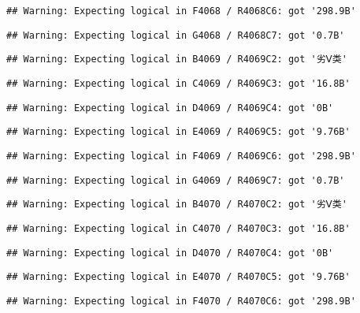 \documentclass[
]{article}
\begin{document}
\begin{verbatim}
## Warning: Expecting logical in F4068 / R4068C6: got '298.9B'
\end{verbatim}

\begin{verbatim}
## Warning: Expecting logical in G4068 / R4068C7: got '0.7B'
\end{verbatim}

\begin{verbatim}
## Warning: Expecting logical in B4069 / R4069C2: got '劣Ⅴ类'
\end{verbatim}

\begin{verbatim}
## Warning: Expecting logical in C4069 / R4069C3: got '16.8B'
\end{verbatim}

\begin{verbatim}
## Warning: Expecting logical in D4069 / R4069C4: got '0B'
\end{verbatim}

\begin{verbatim}
## Warning: Expecting logical in E4069 / R4069C5: got '9.76B'
\end{verbatim}

\begin{verbatim}
## Warning: Expecting logical in F4069 / R4069C6: got '298.9B'
\end{verbatim}

\begin{verbatim}
## Warning: Expecting logical in G4069 / R4069C7: got '0.7B'
\end{verbatim}

\begin{verbatim}
## Warning: Expecting logical in B4070 / R4070C2: got '劣Ⅴ类'
\end{verbatim}

\begin{verbatim}
## Warning: Expecting logical in C4070 / R4070C3: got '16.8B'
\end{verbatim}

\begin{verbatim}
## Warning: Expecting logical in D4070 / R4070C4: got '0B'
\end{verbatim}

\begin{verbatim}
## Warning: Expecting logical in E4070 / R4070C5: got '9.76B'
\end{verbatim}

\begin{verbatim}
## Warning: Expecting logical in F4070 / R4070C6: got '298.9B'
\end{verbatim}
\end{document}
